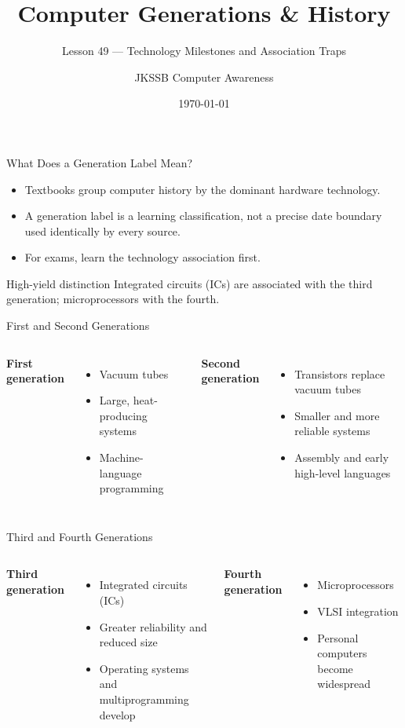 \documentclass[aspectratio=169]{beamer}
\title{Computer Generations \& History}
\subtitle{Lesson 49 --- Technology Milestones and Association Traps}
\author{JKSSB Computer Awareness}
\date{\today}
\begin{document}
\frame{\titlepage}

\begin{frame}{What Does a Generation Label Mean?}
  \begin{itemize}
    \item Textbooks group computer history by the dominant hardware
      technology.
    \item A generation label is a learning classification, not a precise
      date boundary used identically by every source.
    \item For exams, learn the technology association first.
  \end{itemize}
  \begin{block}{High-yield distinction}
    Integrated circuits (ICs) are associated with the third generation;
    microprocessors with the fourth.
  \end{block}
\end{frame}

\begin{frame}{First and Second Generations}
  \begin{columns}[T]
      \textbf{First generation}
      \begin{itemize}
        \item Vacuum tubes
        \item Large, heat-producing systems
        \item Machine-language programming
      \end{itemize}
      \textbf{Second generation}
      \begin{itemize}
        \item Transistors replace vacuum tubes
        \item Smaller and more reliable systems
        \item Assembly and early high-level languages
      \end{itemize}
  \end{columns}
\end{frame}

\begin{frame}{Third and Fourth Generations}
  \begin{columns}[T]
      \textbf{Third generation}
      \begin{itemize}
        \item Integrated circuits (ICs)
        \item Greater reliability and reduced size
        \item Operating systems and multiprogramming develop
      \end{itemize}
      \textbf{Fourth generation}
      \begin{itemize}
        \item Microprocessors
        \item VLSI integration
        \item Personal computers become widespread
      \end{itemize}
  \end{columns}
\end{frame}
\end{document}
